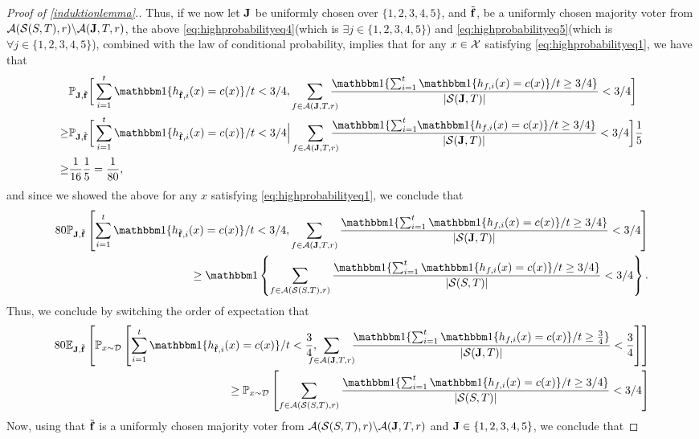 \begin{proof}[Proof of \cref{induktionlemma}.]
Thus, if we now let $\mathbf{J}$ be uniformly chosen over $\{1,2,3,4,5\}$, and $\tilde{\mathbf{f}}$, be a uniformly chosen majority voter from $\mathcal{A}(\mathcal{S}(S,T),r) \backslash \mathcal{A}(\mathbf{J},T,r)$, the above \cref{eq:highprobabilityeq4}(which is $\exists j\in\{1,2,3,4,5\}$) and \cref{eq:highprobabilityeq5}(which is $\forall j\in\{1,2,3,4,5\}$), combined with the law of conditional probability, implies that for any $x\in\mathcal{X}$ satisfying \cref{eq:highprobabilityeq1}, we have that 
    \begin{align*}
    &\p_{\rJ,\rf}\bigg[
    \sum_{i=1}^{t} \ind\{h_{\rf,i}(x)=c(x)\}/t< 3/4,
    \sum_{f\in \cA(\rJ,T,r)}\negmedspace \negmedspace \negmedspace \negmedspace  \frac{\ind\{\sum_{i=1}^{t} \ind\{h_{f,i}(x)=c(x)\}/t\geq 3/4\}}{|\cS(\rJ,T)|}<3/4\bigg]
    \\
    \geq&
    \p_{\rJ,\rf}\bigg[
    \sum_{i=1}^{t} \ind\{h_{\rf,i}(x)=c(x)\}/t< 3/4 \Big|
    \sum_{f\in \cA(\rJ,T,r)} \negmedspace \negmedspace \negmedspace \negmedspace \frac{\ind\{\sum_{i=1}^{t} \negmedspace  \ind\{h_{f,i}(x)=c(x)\}/t\geq 3/4\}}{|\cS(\rJ,T)|}<3/4\bigg]\frac{1}{5}
    \\\geq&
    \frac{1}{16}\frac{1}{5}=\frac{1}{80},
    \end{align*}
and since we showed the above for any $x$ satisfying \cref{eq:highprobabilityeq1}, we conclude that 
    \begin{align*}
    80\p_{\rJ,\rf}\left[
    \sum_{i=1}^{t} \ind\{h_{\rf,i}(x)=c(x)\}/t< 3/4,
    \sum_{f\in \cA(\rJ,T,r)} \frac{\ind\{\sum_{i=1}^{t} \ind\{h_{f,i}(x)=c(x)\}/t\geq 3/4\}}{|\cS(\rJ,T)|}<3/4\right]
    \\
    \geq 
    \ind \left\{  
      \sum_{f\in \cA(\cS(S,T),r)} \frac{\ind\{\sum_{i=1}^{t} \ind\{h_{f,i}(x)=c(x)\}/t\geq 3/4\}}{|\cS(S,T)|}
      <3/4\right\}.
    \end{align*}
Thus, we conclude by switching the order of expectation that
    \begin{align}\label{eq:highprobabilityeq6}
      80\e_{\rJ,\rf}
      \left[
        \p_{x\sim \cD}
        \left[
    \sum_{i=1}^{t} \ind\{h_{\rf,i}(x)=c(x)\}/t< \frac{3}{4},\negmedspace \negmedspace \negmedspace \negmedspace 
    \sum_{f\in \cA(\rJ,T,r)} \negmedspace \negmedspace \frac{\ind\{\sum_{i=1}^{t} \ind\{h_{f,i}(x)=c(x)\}/t\geq \frac{3}{4}\}}{|\cS(\rJ,T)|}
    <\frac{3}{4}\right]
    \right]
    \nonumber
    \\
    \geq 
    \p_{x\sim \cD} \left[  
      \sum_{f\in \cA(\cS(S,T),r)} \frac{\ind\{\sum_{i=1}^{t} \ind\{h_{f,i}(x)=c(x)\}/t\geq 3/4\}}{|\cS(S,T)|}
       <3/4\right]
    \end{align}
Now, using that $\tilde{\mathbf{f}}$ is a uniformly chosen majority voter from $\mathcal{A}(\mathcal{S}(S,T),r) \backslash \mathcal{A}(\mathbf{J},T,r)$ and $\mathbf{J}\in\{1,2,3,4,5\}$, we conclude that 
    

\end{proof}
